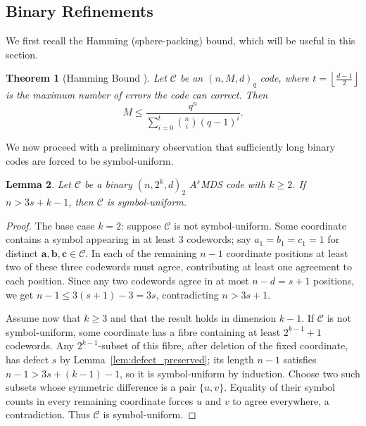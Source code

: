 \documentclass[12pt, letterpaper]{article}
\theoremstyle{plain}
\newtheorem{theorem}{Theorem}[section]
\newtheorem{lemma}[theorem]{Lemma}
\theoremstyle{definition}
\begin{document}
	\subsection{Binary Refinements}
	\label{sec:binary_refinements}

	We first recall the Hamming (sphere-packing) bound, which will be useful in this section.
	
	\begin{theorem}[Hamming Bound \cite{Hamming1950, MacWilliamsSloane1977}]
		\label{thm:hamming}
		Let $\mathcal{C}$ be an $(n,M,d)_q$ code, where $t = \left\lfloor \frac{d-1}{2} \right\rfloor$ is the maximum number of errors the code can correct. Then
		\[
		M \leq \frac{q^n}{\sum_{i=0}^{t} \binom{n}{i} (q-1)^i}.
		\]
	\end{theorem}
	
	We now proceed with a preliminary observation  that sufficiently long binary codes are forced to be symbol-uniform.
	
	\begin{lemma}\label{lem:binary_symbol_uniform_bound}
		Let $\mathcal{C}$ be a binary $(n, 2^k, d)_2$ $A^s$MDS code with $k \ge 2$.
		If $n > 3s + k - 1$, then $\mathcal{C}$ is symbol-uniform.
	\end{lemma}
	\begin{proof}
		The base case $k = 2$: suppose $\mathcal{C}$ is not symbol-uniform. Some coordinate contains a symbol appearing in at least $3$ codewords; say
		$a_1 = b_1 = c_1 = 1$ for distinct $\mathbf{a}, \mathbf{b}, \mathbf{c} \in \mathcal{C}$. In each of the remaining $n-1$ coordinate positions at least two of these three codewords must agree, contributing at least one agreement to each position. Since any two codewords agree in at most $n - d = s+1$ positions, we get $n-1 \le 3(s+1)-3 = 3s$, contradicting $n > 3s+1$.
		
		Assume now that $k\ge3$ and that the result holds in dimension $k-1$. If $\mathcal C$ is not symbol-uniform, some coordinate has a fibre containing at least $2^{k-1}+1$ codewords. Any $2^{k-1}$-subset of this fibre, after deletion of the fixed coordinate, has defect $s$ by Lemma~\ref{lem:defect_preserved}; its length $n-1$ satisfies $n-1>3s+(k-1)-1$, so it is symbol-uniform by induction. Choose two such subsets whose symmetric difference is a pair $\{u,v\}$. Equality of their symbol counts in every remaining coordinate forces $u$ and $v$ to agree everywhere, a contradiction. Thus $\mathcal C$ is symbol-uniform.
	\end{proof}
	
\end{document}
